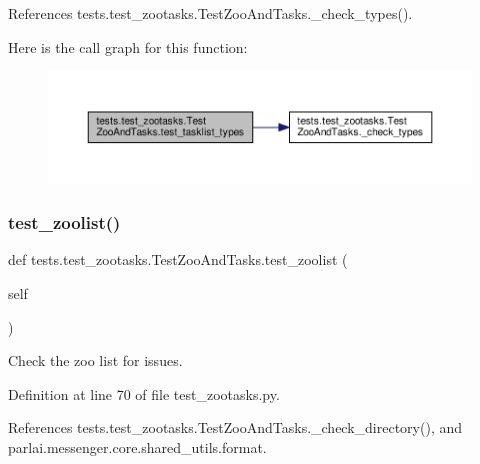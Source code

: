 References tests.\+test\+\_\+zootasks.\+Test\+Zoo\+And\+Tasks.\+\_\+check\+\_\+types().

Here is the call graph for this function\+:
\nopagebreak
\begin{figure}[H]
\begin{center}
\leavevmode
\includegraphics[width=350pt]{classtests_1_1test__zootasks_1_1TestZooAndTasks_ae25086584b24c10c24a9bda486b32c4a_cgraph}
\end{center}
\end{figure}
\mbox{\label{classtests_1_1test__zootasks_1_1TestZooAndTasks_a1c1bb2568bc1871c11d14ac136a9e2b3}} 
\subsubsection{\texorpdfstring{test\+\_\+zoolist()}{test\_zoolist()}}
{\footnotesize\ttfamily def tests.\+test\+\_\+zootasks.\+Test\+Zoo\+And\+Tasks.\+test\+\_\+zoolist (\begin{DoxyParamCaption}\item[{}]{self }\end{DoxyParamCaption})}

\begin{DoxyVerb}Check the zoo list for issues.\end{DoxyVerb}
 

Definition at line 70 of file test\+\_\+zootasks.\+py.



References tests.\+test\+\_\+zootasks.\+Test\+Zoo\+And\+Tasks.\+\_\+check\+\_\+directory(), and parlai.\+messenger.\+core.\+shared\+\_\+utils.\+format.

